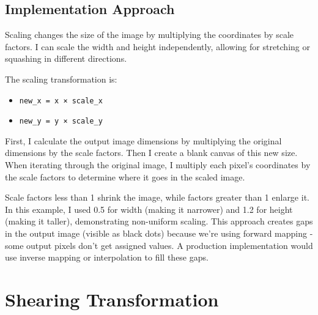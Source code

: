 \documentclass[12pt,a4paper]{report}
\begin{document}
\subsection{Implementation Approach}
Scaling changes the size of the image by multiplying the coordinates by scale factors. I can scale the width and height independently, allowing for stretching or squashing in different directions.

The scaling transformation is:
\begin{itemize}
    \item \texttt{new\_x = x × scale\_x}
    \item \texttt{new\_y = y × scale\_y}
\end{itemize}

First, I calculate the output image dimensions by multiplying the original dimensions by the scale factors. Then I create a blank canvas of this new size. When iterating through the original image, I multiply each pixel's coordinates by the scale factors to determine where it goes in the scaled image.

Scale factors less than 1 shrink the image, while factors greater than 1 enlarge it. In this example, I used 0.5 for width (making it narrower) and 1.2 for height (making it taller), demonstrating non-uniform scaling. This approach creates gaps in the output image (visible as black dots) because we're using forward mapping - some output pixels don't get assigned values. A production implementation would use inverse mapping or interpolation to fill these gaps.

\section{Shearing Transformation}
\end{document}
